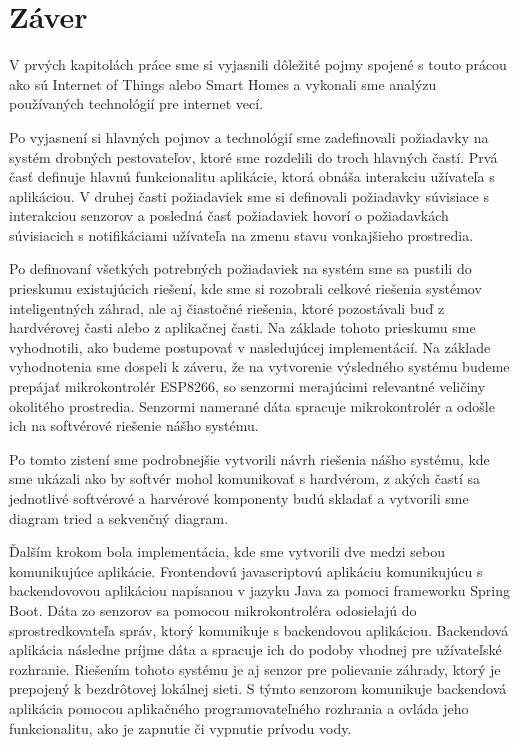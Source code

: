 \documentclass[twoside]{ctuthesis}
\theoremstyle{plain}
\theoremstyle{definition}
\theoremstyle{note}
\begin{document}
\chapter{Záver}
V prvých kapitolách práce sme si vyjasnili dôležité pojmy spojené s touto prácou ako sú Internet of Things alebo Smart Homes a vykonali sme analýzu používaných technológií pre internet vecí.

 Po vyjasnení si hlavných pojmov a technológií sme zadefinovali požiadavky na systém drobných pestovateľov, ktoré sme rozdelili do troch hlavných častí. Prvá časť definuje hlavnú funkcionalitu aplikácie, ktorá obnáša interakciu užívateľa s aplikáciou. V druhej časti požiadaviek sme si definovali požiadavky súvisiace s interakciou senzorov a posledná časť požiadaviek hovorí o požiadavkách súvisiacich s notifikáciami užívateľa na zmenu stavu vonkajšieho prostredia.

Po definovaní všetkých potrebných požiadaviek na systém sme sa pustili do prieskumu existujúcich riešení, kde sme si rozobrali celkové riešenia systémov inteligentných záhrad, ale aj čiastočné riešenia, ktoré pozostávali buď z hardvérovej časti alebo z aplikačnej časti. Na základe tohoto prieskumu sme vyhodnotili, ako budeme postupovať v nasledujúcej implementácií. Na základe vyhodnotenia sme dospeli k záveru, že na vytvorenie výsledného systému budeme prepájať mikrokontrolér ESP8266, so senzormi merajúcimi relevantné veličiny okolitého prostredia. Senzormi namerané dáta spracuje mikrokontrolér a odošle ich na softvérové riešenie nášho systému.

 Po tomto zistení sme podrobnejšie vytvorili návrh riešenia nášho systému, kde sme ukázali ako by softvér mohol komunikovať s hardvérom, z akých častí sa jednotlivé softvérové a harvérové komponenty budú skladať a vytvorili sme diagram tried a sekvenčný diagram. 
 
 Ďalším krokom bola implementácia, kde sme vytvorili dve medzi sebou komunikujúce aplikácie. Frontendovú javascriptovú aplikáciu komunikujúcu s backendovovou aplikáciou napísanou v jazyku Java za pomoci frameworku Spring Boot. Dáta zo senzorov sa pomocou mikrokontroléra odosielajú do sprostredkovateľa správ, ktorý komunikuje s backendovou aplikáciou. Backendová aplikácia následne príjme dáta a spracuje ich do podoby vhodnej pre užívateľské rozhranie. Riešením tohoto systému je aj senzor pre polievanie záhrady, ktorý je prepojený k bezdrôtovej lokálnej sieti. S týmto senzorom komunikuje backendová aplikácia pomocou aplikačného programovateľného rozhrania a ovláda jeho funkcionalitu, ako je zapnutie či vypnutie prívodu vody. 
\end{document}
